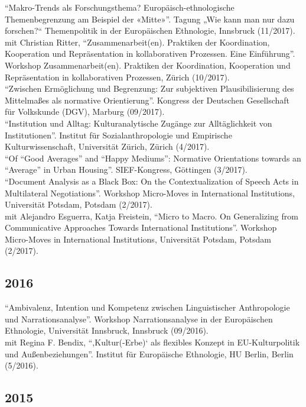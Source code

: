 \enquote{Makro-Trends als Forschungsthema? Europäisch-ethnologische Themenbegrenzung am Beispiel der «Mitte»}. Tagung „Wie kann man nur dazu forschen?“ Themenpolitik in der Europäischen Ethnologie, Innsbruck (11/2017).\\[.25cm]mit Christian Ritter, \enquote{Zusammenarbeit(en). Praktiken der Koordination, Kooperation und Repräsentation in kollaborativen Prozessen. Eine Einführung}. Workshop Zusammenarbeit(en). Praktiken der Koordination, Kooperation und Repräsentation in kollaborativen Prozessen, Zürich (10/2017).\\[.25cm]\enquote{Zwischen Ermöglichung und Begrenzung: Zur subjektiven Plausibilisierung des Mittelmaßes als normative Orientierung}. Kongress der Deutschen Gesellschaft für Volkskunde (DGV), Marburg (09/2017).\\[.25cm]\enquote{Institution und Alltag: Kulturanalytische Zugänge zur Alltäglichkeit von Institutionen}. Institut für Sozialanthropologie und Empirische Kulturwissenschaft, Universität Zürich, Zürich (4/2017).\\[.25cm]\enquote{Of “Good Averages” and “Happy Mediums”: Normative Orientations towards an “Average” in Urban Housing}. SIEF-Kongress, Göttingen (3/2017).\\[.25cm]\enquote{Document Analysis as a Black Box: On the Contextualization of Speech Acts in Multilateral Negotiations}. Workshop Micro-Moves in International Institutions, Universität Potsdam, Potsdam (2/2017).\\[.25cm]mit Alejandro Esguerra, Katja Freistein, \enquote{Micro to Macro. On Generalizing from Communicative Approaches Towards International Institutions}. Workshop Micro-Moves in International Institutions, Universität Potsdam, Potsdam (2/2017).\subsection*{2016}
\enquote{Ambivalenz, Intention und Kompetenz zwischen Linguistischer Anthropologie und Narrationsanalyse}. Workshop Narrationsanalyse in der Europäischen Ethnologie, Universität Innsbruck, Innsbruck (09/2016).\\[.25cm]mit Regina F. Bendix, \enquote{,Kultur(-Erbe)‘ als flexibles Konzept in EU-Kulturpolitik und Außenbeziehungen}. Institut für Europäische Ethnologie, HU Berlin, Berlin (5/2016).\subsection*{2015}
